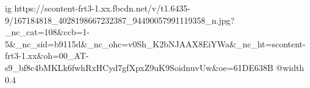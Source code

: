  
 
 
 
 

\ifcmt
  ig https://scontent-frt3-1.xx.fbcdn.net/v/t1.6435-9/167184818_4028198667232387_94490057991119358_n.jpg?_nc_cat=108&ccb=1-5&_nc_sid=b9115d&_nc_ohc=v0Sh_K2bNJAAX8EiYWa&_nc_ht=scontent-frt3-1.xx&oh=00_AT-s9_bf8c4bMKLk6fwhRxHCyd7gfXpxZ9uK9SoidnuvUw&oe=61DE638B
  @width 0.4
\fi
